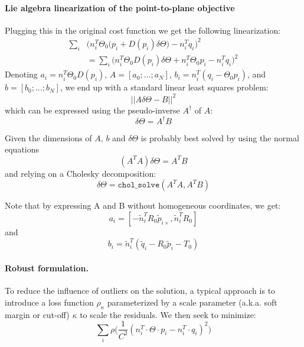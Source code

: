 \paragraph{Lie algebra linearization of the point-to-plane objective}
Plugging this in the original cost function we get the following linearization:
\begin{equation}
\begin{split}
\sum_i & \Big(n_i^T \Theta_0 \big(p_i + D(p_i)\delta\Theta \big) - n_i^T q_i\Big)^2
\\
&= \sum_i \Big(n_i^T \Theta_0 D(p_i)\delta\Theta + n_i^T \Theta_0 p_i - n_i^T q_i\Big)^2
\end{split}
\end{equation}
Denoting $a_i = n_i^T \Theta_0 D(p_i)$, $A=[a_0;\ldots;a_N]$,
$b_i = n_i^T (q_i - \Theta_0 p_i)$, and $b=[b_0;\ldots;b_N]$, we end up with a standard linear least squares problem:
\begin{equation}
||A \delta\Theta - B||^2
\end{equation}
which can be expressed using the pseudo-inverse $A^{\dagger}$ of $A$:
\begin{equation}
\delta\Theta = A^{\dagger} B
\end{equation}

Given the dimensions of $A$, $b$ and $\delta\Theta$ is probably best solved by using the normal equations
\begin{equation}
(A^T A) \delta\Theta = A^T B
\end{equation}
and relying on a Cholesky decomposition:
\begin{equation}
\delta\Theta = \texttt{chol\_solve}(A^T A, A^T B)
\end{equation}

Note that by expressing A and B without homogeneous coordinates, we get:
\begin{equation}
a_i = [-\tilde{n}_i^T R_0 {{\tilde{p}}_{i\times}}, \tilde{n}_i^T R_0]
\end{equation}
and
\begin{equation}
b_i = \tilde{n}_i^T (\tilde{q}_i - R_0 \tilde{p}_i - T_0)
\end{equation}

\paragraph{Robust formulation.}
To reduce the influence of outliers on the solution, a typical approach is to introduce a
loss function $\rho_\kappa$ parameterized by a scale parameter (a.k.a. soft margin or cut-off) $\kappa$ to scale the residuals. We then seek to minimize:
\iffalse
\begin{equation}
\sum_i \rho\big(\frac{1}{C^2}(n_i^T \cdot \Theta \cdot p_i - n_i^T \cdot q_i)^2\big)
\end{equation}

